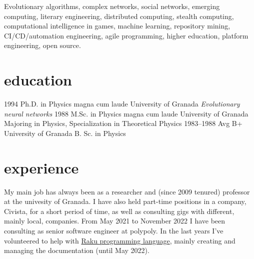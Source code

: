 \documentclass[]{friggeri-jj-cv}
\begin{document}
Evolutionary algorithms, complex networks, social networks, emerging
computing, literary engineering, distributed computing, stealth
computing, computational intelligence in games, machine learning,
repository mining, CI/CD/automation engineering, agile programming,
higher education, platform engineering, open source.

\section{education}

\begin{entrylist}
  \entry
    {1994}
    {Ph.D. {\normalfont in Physics} magna cum laude}
    {University of Granada}
    {\emph{Evolutionary neural networks}}
  \entry
    {1988}
    {M.Sc. {\normalfont in Physics} magna cum laude}
    {University of Granada}
    {Majoring in Physics, Specialization in Theoretical Physics}
  \entry
    {1983–1988}
    {Avg B+}
    {University of Granada}
    {B. Sc. in Physics}
\end{entrylist}

\section{experience}

My main job has always been as a researcher and (since 2009 tenured) professor
at the univesity of Granada. I have also held part-time positions in a company,
Civista, for a short period of time, as well as consulting gigs with different,
mainly local, companies. From May 2021 to November 2022 I have been consulting
as senior software engineer at polypoly.  In the last years I've volunteered to
help with \href{https://raku.org}{Raku programming language}, mainly creating
and managing the documentation (until May 2022).
\end{document}
